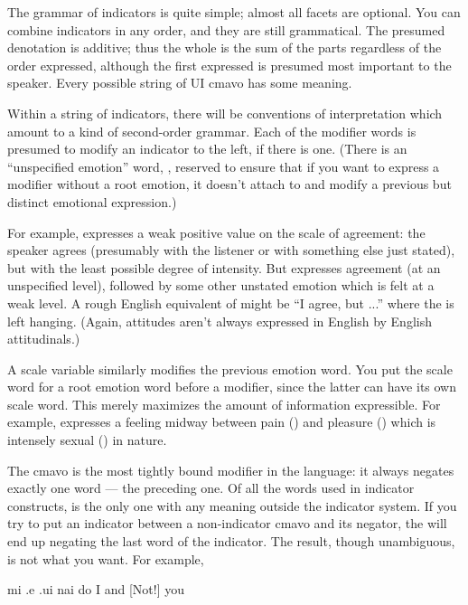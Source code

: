 The grammar of indicators is quite simple; almost all facets
    are optional. You can combine indicators in any order, and they
    are still grammatical. The presumed denotation is additive;
    thus the whole is the sum of the parts regardless of the order
    expressed, although the first expressed is presumed most
    important to the speaker. Every possible string of UI cmavo has
    some meaning.

Within a string of indicators, there will be conventions of
    interpretation which amount to a kind of second-order grammar.
    Each of the modifier words is presumed to modify an indicator
    to the left, if there is one. (There is an ``unspecified
    emotion'' word, , reserved to ensure that if you want
    to express a modifier without a root emotion, it doesn't attach
    to and modify a previous but distinct emotional
    expression.)

For example,  expresses a weak positive value on
    the scale of agreement: the speaker agrees (presumably with the
    listener or with something else just stated), but with the
    least possible degree of intensity. But 
    expresses agreement (at an unspecified level), followed by some
    other unstated emotion which is felt at a weak level. A rough
    English equivalent of  might be ``I agree, but
    ...'' where the  is left hanging. (Again, attitudes
    aren't always expressed in English by English
    attitudinals.)

A scale variable similarly modifies the previous emotion
    word. You put the scale word for a root emotion word before a
    modifier, since the latter can have its own scale word. This
    merely maximizes the amount of information expressible. For
    example,  expresses a feeling midway
    between pain () and pleasure () which is
    intensely sexual () in nature.

The cmavo  is the most tightly bound modifier in the
    language: it always negates exactly one word --- the preceding
    one. Of all the words used in indicator constructs,  is
    the only one with any meaning outside the indicator system. If
    you try to put an indicator between a non-indicator cmavo and
    its  negator, the  will end up negating the last
    word of the indicator. The result, though unambiguous, is not
    what you want. For example,
\begin{example}
mi .e .ui nai do\n
I and  [Not!] you
\end{example}

